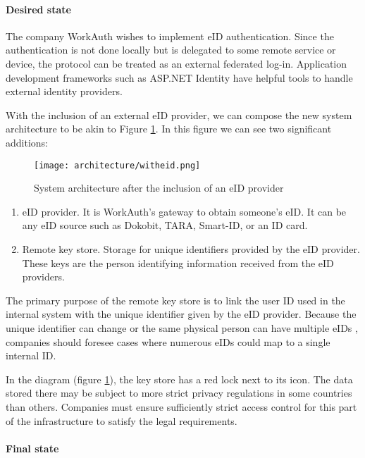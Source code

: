 \paragraph{Desired state}

The company WorkAuth wishes to implement eID authentication. Since the authentication is not done locally but is delegated to some remote service or device, the protocol can be treated as an external federated log-in. Application development frameworks such as ASP.NET Identity have helpful tools to handle external identity providers.

With the inclusion of an external eID provider, we can compose the new system architecture to be akin to Figure \ref{fig:sys-highlevel-witheid}. In this figure we can see two significant additions:

\begin{figure}
  \centering
  \texttt{[image: architecture/witheid.png]}
  \caption{System architecture after the inclusion of an eID provider}
  \label{fig:sys-highlevel-witheid}
\end{figure}

\begin{enumerate}
  \item {eID provider}. It is WorkAuth's gateway to obtain someone's eID. It can be any eID source such as Dokobit, TARA, Smart-ID, or an ID card.
  \item {Remote key store}. Storage for unique identifiers provided by the eID provider. These keys are the person identifying information received from the eID providers.
\end{enumerate}

The primary purpose of the remote key store is to link the user ID used in the internal system with the unique identifier given by the eID provider. Because the unique identifier can change or the same physical person can have multiple eIDs \cite{eidas-saml}, companies should foresee cases where numerous eIDs could map to a single internal ID.

In the diagram (figure \ref{fig:sys-highlevel-witheid}), the key store has a red lock next to its icon. The data stored there may be subject to more strict privacy regulations in some countries than others. Companies must ensure sufficiently strict access control for this part of the infrastructure to satisfy the legal requirements.

\paragraph{Final state}

